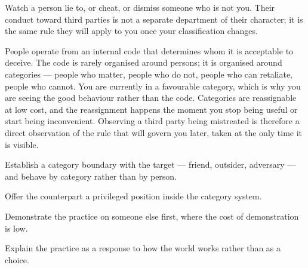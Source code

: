 


\begin{core}
Watch a person lie to, or cheat, or dismiss someone who is not you. Their conduct toward third parties is not a separate department of their character; it is the same rule they will apply to you once your classification changes.
\end{core}

\begin{mechanism}
People operate from an internal code that determines whom it is acceptable to deceive. The code is rarely organised around persons; it is organised around categories --- people who matter, people who do not, people who can retaliate, people who cannot. You are currently in a favourable category, which is why you are seeing the good behaviour rather than the code. Categories are reassignable at low cost, and the reassignment happens the moment you stop being useful or start being inconvenient. Observing a third party being mistreated is therefore a direct observation of the rule that will govern you later, taken at the only time it is visible.
\end{mechanism}

\begin{application}
  \item Establish a category boundary with the target --- friend, outsider, adversary --- and behave by category rather than by person.
  \item Offer the counterpart a privileged position inside the category system.
  \item Demonstrate the practice on someone else first, where the cost of demonstration is low.
  \item Explain the practice as a response to how the world works rather than as a choice.
\end{application}

